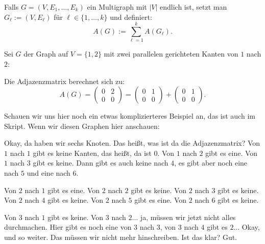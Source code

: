 \begin{math-stroke}
Falls $G = (V, E_1, \dots, E_k)$ ein Multigraph mit $|V|$ endlich ist, setzt man $G_\ell := (V, E_\ell)$ für $\ell \in \{1, \dots, k\}$ und definiert:
\begin{equation}\label{eq:adjazenzmatrix-multigraph-summe}
A(G) := \sum_{\ell=1}^k A(G_\ell).
\end{equation}

\begin{example}
Sei $G$ der Graph auf $V = \{1, 2\}$ mit zwei parallelen gerichteten Kanten von $1$ nach $2$:

\begin{center}
\end{center}

Die Adjazenzmatrix berechnet sich zu:
\[
A(G) = \begin{pmatrix} 0 & 2 \\ 0 & 0 \end{pmatrix} = \begin{pmatrix} 0 & 1 \\ 0 & 0 \end{pmatrix} + \begin{pmatrix} 0 & 1 \\ 0 & 0 \end{pmatrix}.
\]
\end{example}
\end{math-stroke}

\begin{spoken-clean}[00:33:00 - 00:34:51]
Schauen wir uns hier noch ein etwas komplizierteres Beispiel an, das ist auch im Skript. Wenn wir diesen Graphen hier anschauen:

Okay, da haben wir sechs Knoten. Das heißt, was ist da die Adjazenzmatrix? Von $1$ nach $1$ gibt es keine Kanten, das heißt, da ist $0$. Von $1$ nach $2$ gibt es eine. Von $1$ nach $3$ gibt es keine. Dann gibt es auch keine nach $4$, es gibt aber noch eine nach $5$ und eine nach $6$.

Von $2$ nach $1$ gibt es eine. Von $2$ nach $2$ gibt es keine. Von $2$ nach $3$ gibt es keine. Von $2$ nach $4$ gibt es keine. Von $2$ nach $5$ gibt es eine. Von $2$ nach $6$ gibt es keine.

Von $3$ nach $1$ gibt es keine. Von $3$ nach $2$... ja, müssen wir jetzt nicht alles durchmachen. Hier gibt es noch eine von $3$ nach $3$, von $3$ nach $4$ gibt es $2$... Okay, und so weiter. Das müssen wir nicht mehr hinschreiben. Ist das klar? Gut.
\end{spoken-clean}


